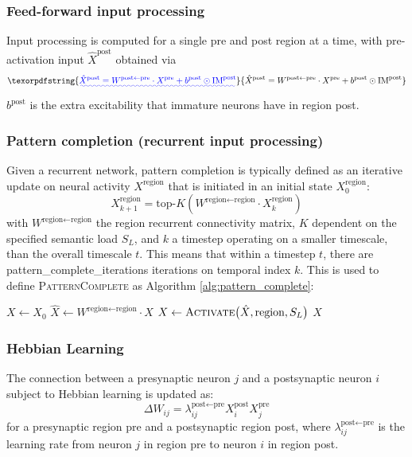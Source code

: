 \documentclass{article}
\providecommand{\DIFaddtex}[1]{{\protect\color{blue}\uwave{#1}}} %
\providecommand{\DIFaddbegin}{} %
\providecommand{\DIFaddend}{} %
\providecommand{\DIFadd}[1]{\texorpdfstring{\DIFaddtex{#1}}{#1}} %
\begin{document}
\subsubsection*{Feed-forward input processing}
Input processing is computed for a single pre and post region at a time, with pre-activation input $\hat{X}^\textrm{post}$ obtained via
 \DIFaddbegin \begin{equation}
    \DIFadd{\hat{X}^\textrm{post} = W^{\textrm{post}\leftarrow\textrm{pre}} \cdot X^\textrm{pre} + b^\textrm{post}\odot\textrm{IM}^\textrm{post}
}\end{equation}\DIFaddend 
$b^\textrm{post}$ is the extra excitability that immature neurons have in region post.
\subsubsection*{Pattern completion (recurrent input processing)}
Given a recurrent network, pattern completion is typically defined as an iterative update on neural activity $X^\textrm{region}$ that is initiated in an initial state $X^\textrm{region}_0$:
\begin{equation}
    X^{\textrm{region}}_{k+1} = \textrm{top-}K(W^{\textrm{region}\leftarrow\textrm{region}}\cdot X^\textrm{region}_{k})
\end{equation}
with $W^{\textrm{region}\leftarrow\textrm{region}}$ the region recurrent connectivity matrix, $K$ dependent on the specified semantic load $S_L$, and $k$ a timestep operating on a smaller timescale,  than the overall timescale $t$. This means that within a timestep $t$, there are pattern\_complete\_iterations iterations on temporal index $k$. This is used to define \textsc{PatternComplete}  as Algorithm \ref{alg:pattern_complete}:
\begin{algorithm}[h!]
\caption[]{Pattern Completion}\label{alg:pattern_complete}
\begin{algorithmic}[1]
 \DIFaddbegin {}
    \DIFaddend \State $X \gets X_0$
     \DIFaddbegin {}
        \DIFaddend \State $\hat{X} \gets W^{\textrm{region} \leftarrow \textrm{region}} \cdot X$
    \State $X \gets \textsc{Activate}\bigl(\hat{X}, \textrm{region}, S_L \bigr)$
    \EndFor
    \State \Return $X$
\EndFunction
\end{algorithmic}
\end{algorithm}
\subsubsection*{Hebbian Learning}
The connection between a presynaptic neuron $j$ and a postsynaptic neuron $i$ subject to Hebbian learning is updated as:
\begin{equation}
            \Delta W_{ij} = \lambda_{ij}^{\textrm{post} \leftarrow \textrm{pre}}
            X_i^\textrm{post} X_j^\textrm{pre}
\end{equation}
for a presynaptic region pre and a postsynaptic region post, where $\lambda_{ij}^{\textrm{post} \leftarrow \textrm{pre}}$ is the learning rate from neuron $j$ in region pre to neuron $i$ in region post.
\end{document}
